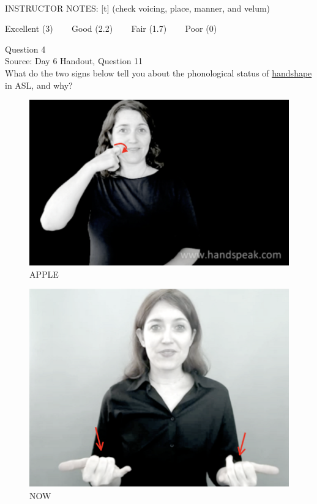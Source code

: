 \documentclass[12pt]{article}
\begin{document}
~\\
INSTRUCTOR NOTES: [t] (check voicing, place, manner, and velum)


\vfill
Excellent (3) ~~~ Good (2.2) ~~~ Fair (1.7) ~~~ Poor (0)
\newpage

{\large Question 4}\\

Source: Day 6 Handout, Question 11\\

What do the two signs below tell you about the phonological status of \underline{handshape} in ASL, and why?\\

\begin{figure}[H]
\includegraphics{../images/asl_apple.png}
\caption{APPLE}
\end{figure}
\begin{figure}[H]
\includegraphics{../images/asl_now.png}
\caption{NOW}
\end{figure}
\end{document}

